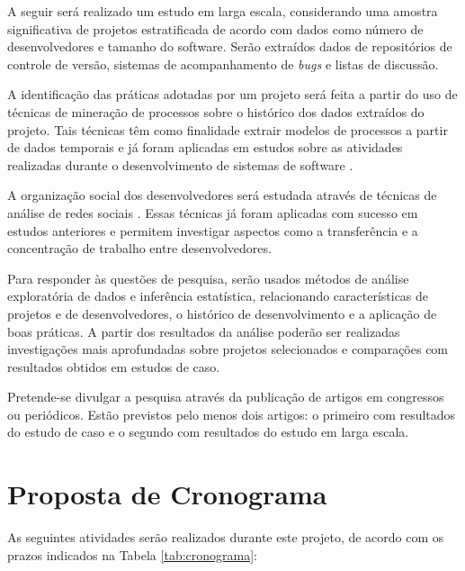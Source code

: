 \documentclass{article}
\begin{document}
A seguir será realizado um estudo em larga escala, considerando uma amostra
significativa de projetos estratificada de acordo com dados como número de
desenvolvedores e tamanho do software. Serão extraídos dados de repositórios de
controle de versão, sistemas de acompanhamento de \emph{bugs} e listas de
discussão.

A identificação das práticas adotadas por um projeto será feita a partir do uso
de técnicas de mineração de processos \cite{aalst2004} sobre o histórico dos
dados extraídos do projeto. Tais técnicas têm como finalidade extrair modelos de
processos a partir de dados temporais e já foram aplicadas em estudos sobre as
atividades realizadas durante o desenvolvimento de sistemas de software
\cite{rubin2007}.

A organização social dos desenvolvedores será estudada através de técnicas de
análise de redes sociais \cite{newman2003}. Essas técnicas já foram aplicadas
com sucesso em estudos anteriores \cite{crowston2005} e permitem investigar
aspectos como a transferência e a concentração de trabalho entre
desenvolvedores. 

Para responder às questões de pesquisa, serão usados métodos de análise
exploratória de dados e inferência estatística, relacionando características de
projetos e de desenvolvedores, o histórico de desenvolvimento e a aplicação de
boas práticas. A partir dos resultados da análise poderão ser realizadas
investigações mais aprofundadas sobre projetos selecionados e comparações com
resultados obtidos em estudos de caso.

Pretende-se divulgar a pesquisa através da publicação de artigos em congressos
ou periódicos. Estão previstos pelo menos dois artigos: o primeiro com
resultados do estudo de caso e o segundo com resultados do estudo em larga
escala.


\section{Proposta de Cronograma}
\newcommand{\newrow}{\\\hline}
\newcommand{\x}{$\bullet$}

As seguintes atividades serão realizados durante este projeto, de acordo com os
prazos indicados na Tabela \ref{tab:cronograma}:
\end{document}
